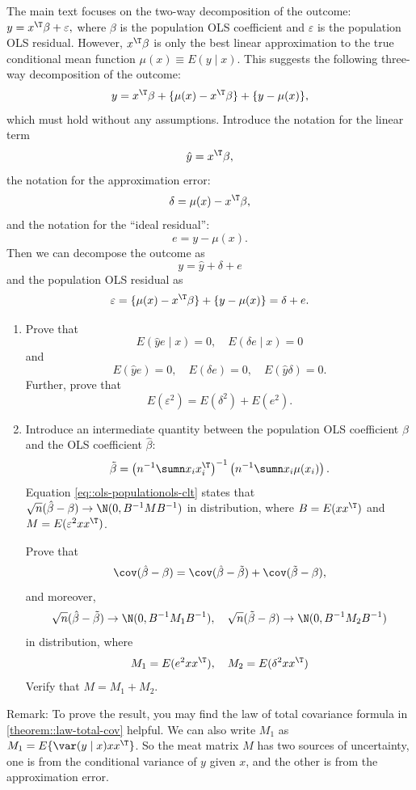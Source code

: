 The main text focuses on the two-way decomposition of the outcome:
$
y = x^{\T} \beta + \varepsilon ,
$
where $\beta$ is the population OLS coefficient and $\varepsilon$ is  the population OLS residual. However, $x^{\T} \beta$ is only the best linear approximation to the true conditional mean function $\mu(x) \equiv E(y \mid x)$. This suggests the following three-way decomposition of the outcome:
$$
y = x^{\T} \beta  + \{ \mu(x)  - x^{\T} \beta \} + \{ y -  \mu(x) \},
$$
which must hold without any assumptions. Introduce the notation for the linear term 
$$
\hat{y} = x^{\T} \beta,
$$ 
 the notation for the approximation error:
$$
\delta = \mu(x)  - x^{\T} \beta ,
$$
and the notation for the
 ``ideal residual'':
$$
e =  y -  \mu(x) .
$$
Then 
we can decompose the outcome as
$$
y = \hat{y}   +   \delta  + e
$$
and
 the population OLS residual as
$$
 \varepsilon  =  \{ \mu(x)  - x^{\T} \beta \} + \{ y -  \mu(x) \} =  \delta  + e. 
$$


\begin{enumerate}
\item
Prove that
$$
E(   \hat{y}    e \mid x ) = 0,\quad
E(   \delta   e \mid x ) = 0
$$
and
$$
E(   \hat{y}    e  ) = 0,\quad
E(   \delta   e   ) = 0,\quad
E(  \hat{y}   \delta  ) = 0.
$$
Further, prove that
$$
E( \varepsilon^2 ) = E(  \delta ^2 ) + E(  e^{2}) . 
$$

\item
Introduce an intermediate quantity between the population OLS coefficient $\beta $ and the OLS coefficient $\hat{\beta} $:
$$
\tilde{\beta} = \left( n^{-1} \sumn x_i x_i^{\T}  \right)^{-1}  \left( n^{-1} \sumn x_i \mu(x_i)  \right).
$$
Equation \eqref{eq::ols-populationols-clt} states that 
$
\sqrt{n} (  \hat{\beta}  - \beta ) \rightarrow \N(0,  B^{-1} M B^{-1} )
$
in distribution, 
where $B = E(xx^{\T})$ and $M = E(\varepsilon^2 xx^{\T})$. 


Prove that 
$$
\cov( \hat{\beta}  - \beta ) = \cov(  \hat{\beta}  - \tilde\beta ) + \cov(   \tilde\beta - \beta  ),
$$
and moreover, 
$$
\sqrt{n} (  \hat{\beta}  - \tilde\beta ) \rightarrow \N(0,  B^{-1} M_1 B^{-1} ),\quad
\sqrt{n} (    \tilde\beta - \beta ) \rightarrow \N(0,  B^{-1} M_2 B^{-1} )
$$
in distribution, where 
$$
M_1 = E(e^{2} xx^{\T}),\quad
M_2 = E( \delta^2 xx^{\T})
$$
Verify that $M = M_1 + M_2$. 
\end{enumerate}


Remark: To prove the result, you may find the law of total covariance formula in \eqref{theorem::law-total-cov} helpful. We can also write $M_1$ as $M_1 = E\{ \var(y\mid x) xx^{\T} \}$. So the meat matrix $M$ has two sources of uncertainty, one is from the conditional variance of $y$ given $x$, and the other is from the approximation error. 
 
 
